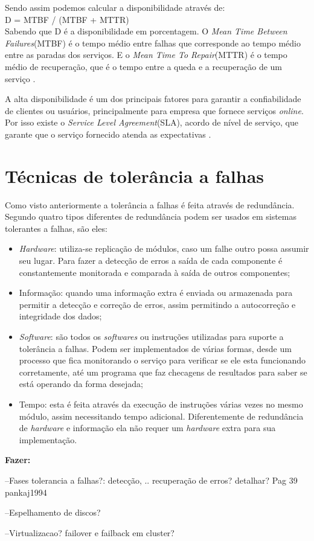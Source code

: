 Sendo assim podemos calcular a disponibilidade através de:\\
D = MTBF / (MTBF + MTTR)\\
Sabendo que D é a disponibilidade em porcentagem. O \textit{Mean Time Between Failures}(MTBF) é o tempo médio entre falhas que corresponde
ao tempo médio entre as paradas dos serviços. E o \textit{Mean Time To Repair}(MTTR) é o tempo médio de recuperação, que é o tempo 
entre a queda e a recuperação de um serviço \cite{goncalves2009}.

A alta disponibilidade é um dos principais fatores para garantir a confiabilidade de clientes ou usuários, principalmente para empresa que 
fornece serviços \textit{online}. Por isso existe o \textit{Service Level Agreement}(SLA), acordo de nível de serviço, 
que garante que o serviço fornecido atenda as expectativas \cite{smith2010}.

\section{Técnicas de tolerância a falhas}

Como visto anteriormente a tolerância a falhas é feita através de redundância. Segundo \cite{norvag2000} quatro tipos diferentes de redundância
podem ser usados em sistemas tolerantes a falhas, são eles:
\begin{itemize}
 \item \textit{Hardware}: utiliza-se replicação de módulos, caso um falhe outro possa assumir seu lugar. Para fazer a detecção de erros
 a saída de cada componente é constantemente monitorada e comparada à saída de outros componentes;
 \item Informação: quando uma informação extra é enviada ou armazenada para permitir a detecção e correção de erros, assim permitindo
 a autocorreção e integridade dos dados;
 \item \textit{Software}: são todos os \textit{softwares} ou instruções utilizadas para suporte a tolerância a falhas. Podem ser implementados
 de várias formas, desde um processo que fica monitorando o serviço para verificar se ele esta funcionando corretamente, até um programa
 que faz checagens de resultados para saber se está operando da forma desejada;
 \item Tempo: esta é feita através da execução de instruções várias vezes no mesmo módulo, assim necessitando tempo adicional. 
 Diferentemente de redundância de \textit{hardware} e informação ela não requer um \textit{hardware} extra para sua implementação.
\end{itemize}



\textbf{Fazer:} 

--Fases tolerancia a falhas?: detecção, .. recuperação de erros? detalhar? Pag 39 pankaj1994

--Espelhamento de discos?

--Virtualizacao? failover e failback em cluster?

